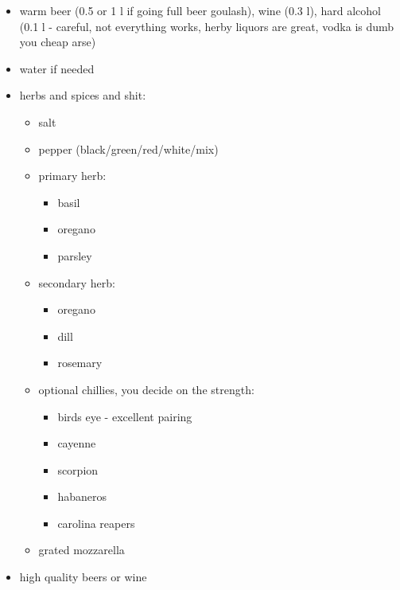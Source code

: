 \documentclass[10pt]{article}
\begin{document}
\begin{itemize}
\begin{itemize}
		\end{itemize}
	\item warm beer (0.5 or 1 l if going full beer goulash), wine (0.3 l), hard alcohol (0.1 l - careful, not everything works, herby liquors are great, vodka is dumb you cheap arse)
	\item water if needed
	\item herbs and spices and shit:
		\begin{itemize}
			\item salt
			\item pepper (black/green/red/white/mix)
			\item primary herb:
				\begin{itemize}
					\item basil
					\item oregano
					\item parsley
				\end{itemize}
			\item secondary herb:
				\begin{itemize}
					\item oregano
					\item dill
					\item rosemary
				\end{itemize}
			\item optional chillies, you decide on the strength:
				\begin{itemize}
					\item birds eye - excellent pairing
					\item cayenne
					\item scorpion
					\item habaneros
					\item carolina reapers
				\end{itemize}
			\item grated mozzarella
		\end{itemize}
	\item high quality beers or wine
\end{itemize}
\end{document}
